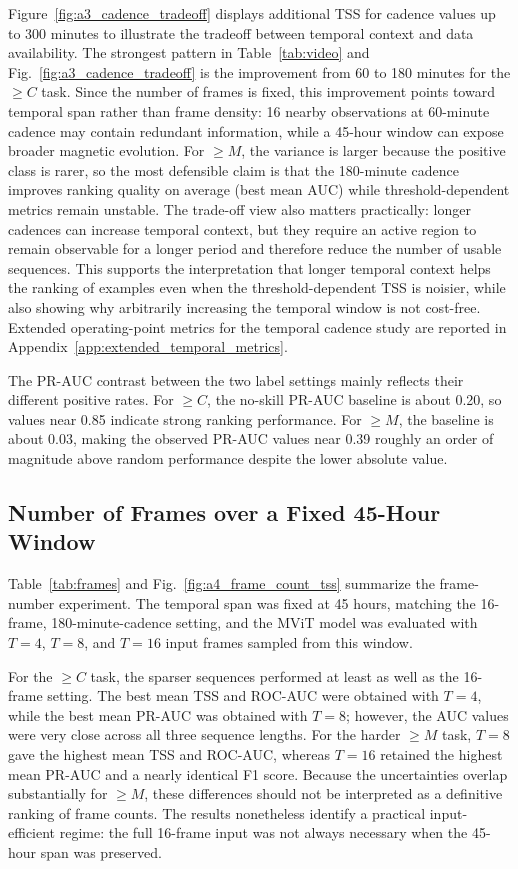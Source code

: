 Figure~\ref{fig:a3_cadence_tradeoff} displays additional TSS for cadence values up to 300 minutes to illustrate the tradeoff between temporal context and data availability. The strongest pattern in Table~\ref{tab:video} and Fig.~\ref{fig:a3_cadence_tradeoff} is the improvement from 60 to 180 minutes for the $\geq C$ task. Since the number of frames is fixed, this improvement points toward temporal span rather than frame density: 16 nearby observations at 60-minute cadence may contain redundant information, while a 45-hour window can expose broader magnetic evolution. For $\geq M$, the variance is larger because the positive class is rarer, so the most defensible claim is that the 180-minute cadence improves ranking quality on average (best mean AUC) while threshold-dependent metrics remain unstable. The trade-off view also matters practically: longer cadences can increase temporal context, but they require an active region to remain observable for a longer period and therefore reduce the number of usable sequences. This supports the interpretation that longer temporal context helps the ranking of examples even when the threshold-dependent TSS is noisier, while also showing why arbitrarily increasing the temporal window is not cost-free. Extended operating-point metrics for the temporal cadence study are reported in Appendix~\ref{app:extended_temporal_metrics}.

The PR-AUC contrast between the two label settings mainly reflects their different positive rates. For $\geq C$, the no-skill PR-AUC baseline is about 0.20, so values near 0.85 indicate strong ranking performance. For $\geq M$, the baseline is about 0.03, making the observed PR-AUC values near 0.39 roughly an order of magnitude above random performance despite the lower absolute value.
\subsection{Number of Frames over a Fixed 45-Hour Window}

Table~\ref{tab:frames} and Fig.~\ref{fig:a4_frame_count_tss} summarize the frame-number experiment. The temporal span was fixed at 45 hours, matching the 16-frame, 180-minute-cadence setting, and the MViT model was evaluated with $T=4$, $T=8$, and $T=16$ input frames sampled from this window. 

For the $\geq C$ task, the sparser sequences performed at least as well as the 16-frame setting. The best mean TSS and ROC-AUC were obtained with $T=4$, while the best mean PR-AUC was obtained with $T=8$; however, the AUC values were very close across all three sequence lengths. For the harder $\geq M$ task, $T=8$ gave the highest mean TSS and ROC-AUC, whereas $T=16$ retained the highest mean PR-AUC and a nearly identical F1 score. Because the uncertainties overlap substantially for $\geq M$, these differences should not be interpreted as a definitive ranking of frame counts. The results nonetheless identify a practical input-efficient regime: the full 16-frame input was not always necessary when the 45-hour span was preserved.

